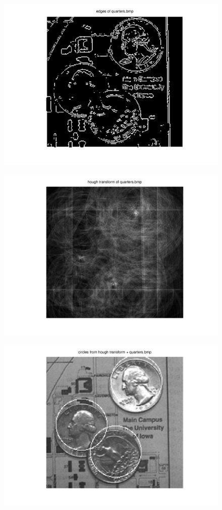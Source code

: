 \documentclass{article}
\begin{document}
	\begin{figure}[H]
		\includegraphics[width=\linewidth]{Q6/partB1.png}
	\end{figure}
	\begin{figure}[H]
		\includegraphics[width=\linewidth]{Q6/partB2.png}
	\end{figure}
	\begin{figure}[H]
		\includegraphics[width=\linewidth]{Q6/partB3.png}
	\end{figure}
	
\end{document}

